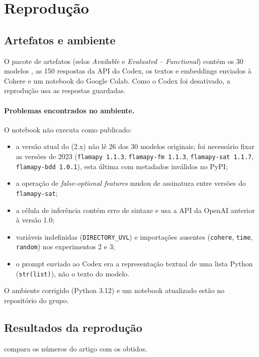 \section{Reprodução}
\label{sec:reproducao}

\subsection{Artefatos e ambiente}
O pacote de artefatos (selos \emph{Available} e \emph{Evaluated -- Functional}) contém os 30 modelos \uvl{}, as 150 respostas da API do Codex, os textos e embeddings enviados à Cohere e um notebook do Google Colab. Como o Codex foi desativado, a reprodução usa as respostas guardadas.

\paragraph{Problemas encontrados no ambiente.} O notebook não executa como publicado: 
\begin{itemize}
  \item a versão atual do \flamapy{} (2.x) não lê 26 dos 30 modelos originais; foi necessário fixar as versões de 2023 (\texttt{flamapy~1.1.3}, \texttt{flamapy-fm~1.1.3}, \texttt{flamapy-sat~1.1.7}, \texttt{flamapy-bdd~1.0.1}), esta última com metadados inválidos no PyPI;
  \item a operação de \emph{false-optional features} mudou de assinatura entre versões do \texttt{flamapy-sat};
  \item a célula de inferência contém erro de sintaxe e usa a API da OpenAI anterior à versão 1.0;
  \item variáveis indefinidas (\texttt{DIRECTORY\_UVL}) e importações ausentes (\texttt{cohere}, \texttt{time}, \texttt{random}) nos experimentos 2 e 3;
  \item o prompt enviado ao Codex era a representação textual de uma lista Python (\texttt{str(list)}), não o texto do modelo.
\end{itemize}
O ambiente corrigido (Python 3.12) e um notebook atualizado estão no repositório do grupo.

\subsection{Resultados da reprodução}
 compara os números do artigo com os obtidos.

